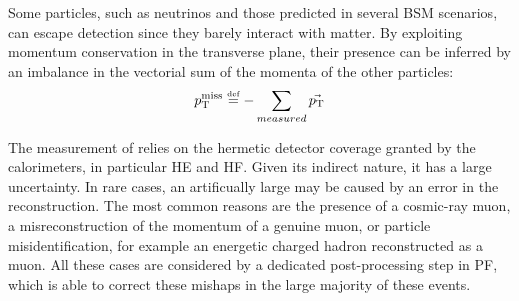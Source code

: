 \label{sec:MET}
Some particles, such as neutrinos and those predicted in several BSM scenarios, can escape detection since they barely interact with matter.
By exploiting momentum conservation in the transverse plane, their presence can be inferred by an imbalance in the vectorial sum of the momenta of the other particles:
\begin{equation}
  p_{\mathrm{T}}^\text{miss} \stackrel{\text{\tiny def}}{=} -\sum_{measured} \vec{p_{\mathrm{T}}}
\end{equation}

The measurement of \ptmiss relies on the hermetic detector coverage granted by the calorimeters, in particular HE and HF.
Given its indirect nature, it has a large uncertainty.
In rare cases, an artificually large \ptmiss may be caused by an error in the reconstruction. %
The most common reasons are the presence of a cosmic-ray muon,
a misreconstruction of the momentum of a genuine muon,
or particle misidentification, for example an energetic charged hadron reconstructed as a muon.
All these cases are considered by a dedicated post-processing step in PF,
which is able to correct these mishaps in the large majority of these events.
